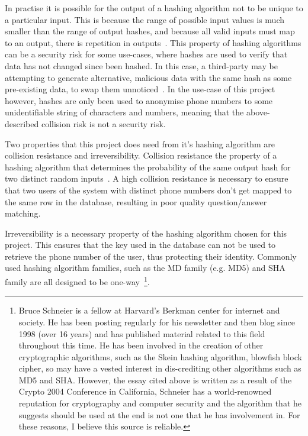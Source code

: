 \documentclass{article}
\begin{document}
In practise it is possible for the output of a hashing algorithm not to be unique to a particular input.  This is because the range of possible input values is much smaller than the range of output hashes, and because all valid inputs must map to an output, there is repetition in outputs~\cite{mitCryptographyMd5}.  This property of hashing algorithms can be a security risk for some use-cases, where hashes are used to verify that data has not changed since been hashed.  In this case, a third-party may be attempting to generate alternative, malicious data with the same hash as some pre-existing data, to swap them unnoticed~\cite{securityEngineeringHashingAnderson}.  In the use-case of this project however, hashes are only been used to anonymise phone numbers to some unidentifiable string of characters and numbers, meaning that the above-described collision risk is not a security risk.

Two properties that this project does need from it's hashing algorithm are collision resistance and irreversibility.  Collision resistance the property of a hashing algorithm that determines the probability of the same output hash for two distinct random inputs~\cite{mitCryptographyMd5}.  A high collision resistance is necessary to ensure that two users of the system with distinct phone numbers don't get mapped to the same row in the database, resulting in poor quality question/answer matching.

Irreversibility is a necessary property of the hashing algorithm chosen for this project.  This ensures that the key used in the database can not be used to retrieve the phone number of the user, thus protecting their identity.  Commonly used hashing algorithm families, such as the MD family (e.g. MD5) and SHA family are all designed to be one-way~\cite{schneierCryptanalysisMD5SHA}\footnote{Bruce Schneier is a fellow at Harvard's Berkman center for internet and society.  He has been posting regularly for his newsletter and then blog since 1998 (over 16 years) and has published material related to this field throughout this time.  He has been involved in the creation of other cryptographic algorithms, such as the Skein hashing algorithm, blowfish block cipher, so may have a vested interest in dis-crediting other algorithms such as MD5 and SHA.  However, the essay cited above is written as a result of the Crypto 2004 Conference in California, Schneier has a world-renowned reputation for cryptography and computer security and the algorithm that he suggests should be used at the end is not one that he has involvement in.  For these reasons, I believe this source is reliable.}.  
\end{document}
